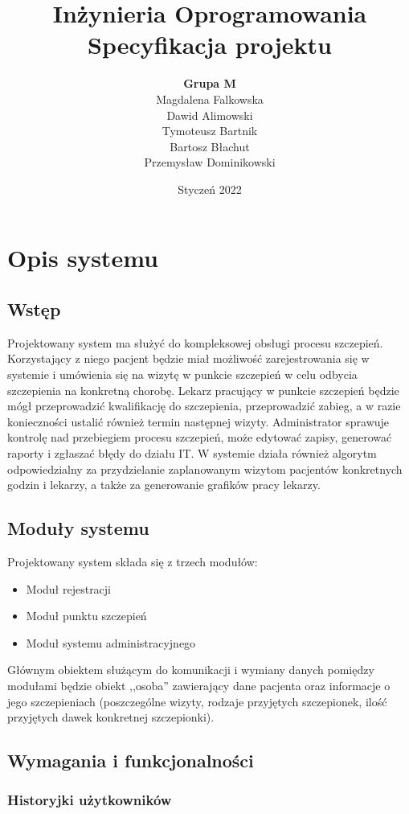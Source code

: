 \documentclass[a4paper,12pt,polish]{article}
\title{Inżynieria Oprogramowania \\ \noindent \textbf{Specyfikacja projektu}}
\author{\textbf{Grupa M} \\ Magdalena Falkowska \\ Dawid Alimowski \\ Tymoteusz Bartnik \\ Bartosz Błachut \\ Przemysław Dominikowski}
\date{Styczeń 2022}
\begin{document}
\maketitle
\newpage

\tableofcontents
\newpage

\section{Opis systemu}

\subsection{Wstęp}
Projektowany system ma służyć do kompleksowej obsługi procesu szczepień. Korzystający z niego pacjent będzie miał możliwość zarejestrowania się w systemie i umówienia się na wizytę w punkcie szczepień w celu odbycia szczepienia na konkretną chorobę. Lekarz pracujący w punkcie szczepień będzie mógł przeprowadzić kwalifikację do szczepienia, przeprowadzić zabieg, a w razie konieczności ustalić również termin następnej wizyty. Administrator sprawuje kontrolę nad przebiegiem procesu szczepień, może edytować zapisy, generować raporty i zgłaszać błędy do działu IT. W systemie działa również algorytm odpowiedzialny za przydzielanie zaplanowanym wizytom pacjentów konkretnych godzin i lekarzy, a także za generowanie grafików pracy lekarzy.  

\subsection{Moduły systemu}
Projektowany system składa się z trzech modułów:
\begin{itemize}
    \item Moduł rejestracji
    \item Moduł punktu szczepień
    \item Moduł systemu administracyjnego
\end{itemize}
Głównym obiektem służącym do komunikacji i wymiany danych pomiędzy modułami będzie obiekt ,,osoba'' zawierający dane pacjenta oraz informacje o jego szczepieniach (poszczególne wizyty, rodzaje przyjętych szczepionek, ilość przyjętych dawek konkretnej szczepionki).

\subsection{Wymagania i funkcjonalności}
\subsubsection{Historyjki użytkowników}
\end{document}
